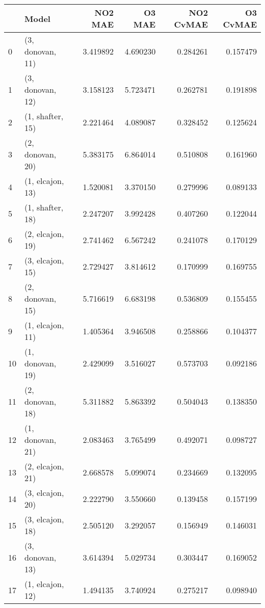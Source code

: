\begin{tabular}{llrrrr}
\toprule
{} &             Model &   NO2 MAE &    O3 MAE &  NO2 CvMAE &  O3 CvMAE \\
\midrule
0  &  (3, donovan, 11) &  3.419892 &  4.690230 &   0.284261 &  0.157479 \\
1  &  (3, donovan, 12) &  3.158123 &  5.723471 &   0.262781 &  0.191898 \\
2  &  (1, shafter, 15) &  2.221464 &  4.089087 &   0.328452 &  0.125624 \\
3  &  (2, donovan, 20) &  5.383175 &  6.864014 &   0.510808 &  0.161960 \\
4  &  (1, elcajon, 13) &  1.520081 &  3.370150 &   0.279996 &  0.089133 \\
5  &  (1, shafter, 18) &  2.247207 &  3.992428 &   0.407260 &  0.122044 \\
6  &  (2, elcajon, 19) &  2.741462 &  6.567242 &   0.241078 &  0.170129 \\
7  &  (3, elcajon, 15) &  2.729427 &  3.814612 &   0.170999 &  0.169755 \\
8  &  (2, donovan, 15) &  5.716619 &  6.683198 &   0.536809 &  0.155455 \\
9  &  (1, elcajon, 11) &  1.405364 &  3.946508 &   0.258866 &  0.104377 \\
10 &  (1, donovan, 19) &  2.429099 &  3.516027 &   0.573703 &  0.092186 \\
11 &  (2, donovan, 18) &  5.311882 &  5.863392 &   0.504043 &  0.138350 \\
12 &  (1, donovan, 21) &  2.083463 &  3.765499 &   0.492071 &  0.098727 \\
13 &  (2, elcajon, 21) &  2.668578 &  5.099074 &   0.234669 &  0.132095 \\
14 &  (3, elcajon, 20) &  2.222790 &  3.550660 &   0.139458 &  0.157199 \\
15 &  (3, elcajon, 18) &  2.505120 &  3.292057 &   0.156949 &  0.146031 \\
16 &  (3, donovan, 13) &  3.614394 &  5.029734 &   0.303447 &  0.169052 \\
17 &  (1, elcajon, 12) &  1.494135 &  3.740924 &   0.275217 &  0.098940 \\
\bottomrule
\end{tabular}
